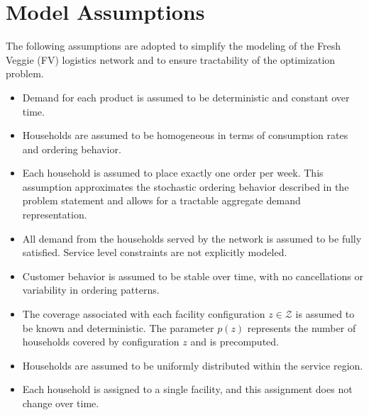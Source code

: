 \documentclass[12pt]{article}
\begin{document}
\section{Model Assumptions}

The following assumptions are adopted to simplify the modeling of the Fresh Veggie (FV) logistics network and to ensure tractability of the optimization problem.

\begin{itemize}

    
    \item Demand for each product is assumed to be deterministic and constant over time.
    
    \item Households are assumed to be homogeneous in terms of consumption rates and ordering behavior.
    
    \item Each household is assumed to place exactly one order per week. This assumption approximates the stochastic ordering behavior described in the problem statement and allows for a tractable aggregate demand representation.
    
    \item All demand from the households served by the network is assumed to be fully satisfied. Service level constraints are not explicitly modeled.
    
    \item Customer behavior is assumed to be stable over time, with no cancellations or variability in ordering patterns.
    
    
    
    \item The coverage associated with each facility configuration $z \in \mathcal{Z}$ is assumed to be known and deterministic. The parameter $p(z)$ represents the number of households covered by configuration $z$ and is precomputed.
    
    \item Households are assumed to be uniformly distributed within the service region.
    
    \item Each household is assigned to a single facility, and this assignment does not change over time.
    

\end{itemize}
\end{document}
